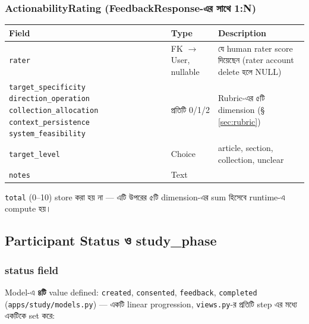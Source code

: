 \documentclass[11pt,a4paper]{article}
\newcommand{\code}[1]{\texttt{\small #1}}
\newcommand{\file}[1]{\texttt{\small #1}}
\begin{document}
\subsubsection{ActionabilityRating (FeedbackResponse-এর সাথে 1:N)}
\begin{longtable}{@{}p{3.9cm}p{2.6cm}p{9.1cm}@{}}
\toprule
\textbf{Field} & \textbf{Type} & \textbf{Description} \\
\midrule
\endhead
\code{rater} & FK $\to$ User, nullable & যে human rater score দিয়েছেন (rater account delete
  হলে NULL) \\
\code{target\_specificity} \newline \code{direction\_operation} \newline
  \code{collection\_allocation} \newline \code{context\_persistence} \newline
  \code{system\_feasibility} & প্রতিটি 0/1/2 & Rubric-এর ৫টি dimension
  (\S\,\ref{sec:rubric}) \\
\code{target\_level} & Choice & article, section, collection, unclear \\
\code{notes} & Text & \\
\bottomrule
\end{longtable}
\code{total} (0--10) store করা হয় না --- এটি উপরের ৫টি dimension-এর sum হিসেবে runtime-এ
compute হয়।

\subsection{Participant Status ও study\_phase}

\subsubsection{status field}
\label{sec:status}
Model-এ \textbf{৪টি} value defined: \code{created}, \code{consented}, \code{feedback},
\code{completed} (\file{apps/study/models.py}) --- একটি linear progression, \code{views.py}-র
প্রতিটি step এর মধ্যে একটিকে set করে:

\begin{center}
\end{center}
\end{document}
